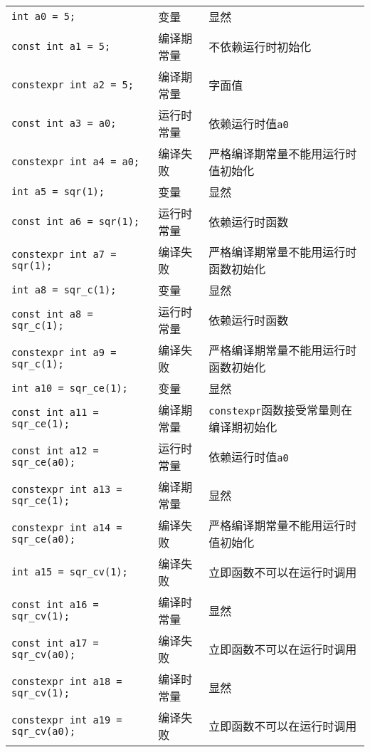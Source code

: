 \documentclass[../main.tex]{subfiles}
\begin{document}
\begin{small}
\begin{longtable}[c]{l|ll}
  \texttt{int a0 = 5;} & 变量 & 显然 \\
  \rowcolor{blue!15}\texttt{const int a1 = 5;} & 编译期常量 & 不依赖运行时初始化 \\
  \texttt{constexpr int a2 = 5;} & 编译期常量 & 字面值 \\
  \texttt{const int a3 = a0;} & 运行时常量 & 依赖运行时值\texttt{a0} \\
  \rowcolor{red!15}\texttt{constexpr int a4 = a0;} & 编译失败 & 严格编译期常量不能用运行时值初始化 \\
  \texttt{int a5 = sqr(1);} & 变量 & 显然 \\
  \texttt{const int a6 = sqr(1);} & 运行时常量 & 依赖运行时函数 \\
  \rowcolor{red!15}\texttt{constexpr int a7 = sqr(1);} & 编译失败 & 严格编译期常量不能用运行时函数初始化 \\
  \texttt{int a8 = sqr\_c(1);} & 变量 & 显然 \\
  \texttt{const int a8 = sqr\_c(1);} & 运行时常量 & 依赖运行时函数 \\
  \rowcolor{red!15}\texttt{constexpr int a9 = sqr\_c(1);} & 编译失败 & 严格编译期常量不能用运行时函数初始化 \\
  \texttt{int a10 = sqr\_ce(1);} & 变量 & 显然 \\
  \rowcolor{blue!15}\texttt{const int a11 = sqr\_ce(1);} & 编译期常量 & \texttt{constexpr}函数接受常量则在编译期初始化 \\
  \texttt{const int a12 = sqr\_ce(a0);} & 运行时常量 & 依赖运行时值\texttt{a0} \\
  \texttt{constexpr int a13 = sqr\_ce(1);} & 编译期常量 & 显然 \\
  \rowcolor{red!15}\texttt{constexpr int a14 = sqr\_ce(a0);} & 编译失败 & 严格编译期常量不能用运行时值初始化 \\
  \rowcolor{red!15}\texttt{int a15 = sqr\_cv(1);} & 编译失败 & 立即函数不可以在运行时调用 \\
  \rowcolor{blue!15}\texttt{const int a16 = sqr\_cv(1);} & 编译时常量 & 显然 \\
  \rowcolor{red!15}\texttt{const int a17 = sqr\_cv(a0);} & 编译失败 & 立即函数不可以在运行时调用 \\
  \texttt{constexpr int a18 = sqr\_cv(1);} & 编译时常量 & 显然 \\
  \rowcolor{red!15}\texttt{constexpr int a19 = sqr\_cv(a0);} & 编译失败 & 立即函数不可以在运行时调用 \\
\end{longtable}
\end{small}
\end{document}
